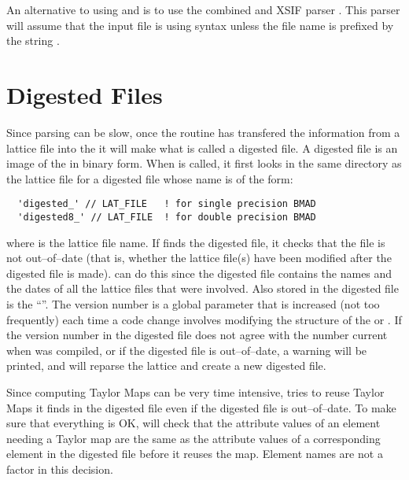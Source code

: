 An alternative to using  and  is to
use the combined \bmad and XSIF parser
. This parser
will assume that the input file is using \bmad syntax unless the file
name is prefixed by the string .

\section{Digested Files}

Since parsing can be slow, once the  routine
has transfered the
information from a lattice file into the  it will make
what is called a digested file. A digested file is an image of the
 in binary form. When  is called, 
it first looks in the same directory as the lattice
file for a digested file whose name is of the form:
\begin{verbatim}
  'digested_' // LAT_FILE   ! for single precision BMAD 
  'digested8_' // LAT_FILE  ! for double precision BMAD 
\end{verbatim}
where  is the lattice file name. If  finds the digested
file, it checks that the file is not out--of--date (that is, whether the
lattice file(s) have been modified after the digested file is made).
 can do this since the digested file contains the names
and the dates of all the lattice files that were involved. Also stored
in the digested file is the ``\bmad {}''. The \bmad
version number is a global parameter that is increased (not too
frequently) each time a code change involves modifying the structure of
the  or . If the \bmad version number in
the digested file does not agree with the number current when 
was compiled, or if the digested
file is out--of--date, a warning will be printed, and 
will reparse the lattice and create a new digested file.

Since computing Taylor Maps can be very time intensive,
 tries to reuse Taylor Maps it finds in the digested
file even if the digested file is out--of--date. To
make sure that everything is OK,  will check that the attribute
values of an element needing a Taylor map are the same as the
attribute values of a corresponding element in the digested file
before it reuses the map. Element names are not a factor in this
decision.

